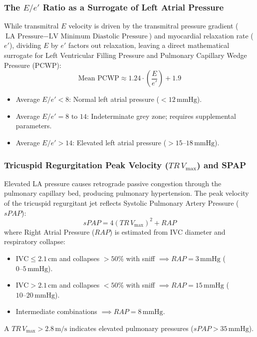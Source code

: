 \documentclass[11pt,a4paper]{article}
\begin{document}
\subsubsection{The \texorpdfstring{$E/e'$}{E/e'} Ratio as a Surrogate of Left Atrial Pressure}
While transmitral $E$ velocity is driven by the transmitral pressure gradient ($\text{LA Pressure} - \text{LV Minimum Diastolic Pressure}$) and myocardial relaxation rate ($e'$), dividing $E$ by $e'$ factors out relaxation, leaving a direct mathematical surrogate for Left Ventricular Filling Pressure and Pulmonary Capillary Wedge Pressure (PCWP):
\begin{equation}
    \text{Mean PCWP} \approx 1.24 \cdot \left( \frac{E}{e'} \right) + 1.9
\end{equation}
\begin{itemize}[leftmargin=*]
    \item Average $E/e' < 8$: Normal left atrial pressure ($< 12\,\text{mmHg}$).
    \item Average $E/e' = 8\text{ to }14$: Indeterminate grey zone; requires supplemental parameters.
    \item Average $E/e' > 14$: Elevated left atrial pressure ($> 15\text{--}18\,\text{mmHg}$).
\end{itemize}

\subsubsection{Tricuspid Regurgitation Peak Velocity (\texorpdfstring{$TR\,V_{\text{max}}$}{TR Vmax}) and SPAP}
Elevated LA pressure causes retrograde passive congestion through the pulmonary capillary bed, producing pulmonary hypertension. The peak velocity of the tricuspid regurgitant jet reflects Systolic Pulmonary Artery Pressure ($sPAP$):
\begin{equation}
    sPAP = 4 \left( TR\,V_{\text{max}} \right)^2 + RAP
\end{equation}
where Right Atrial Pressure ($RAP$) is estimated from IVC diameter and respiratory collapse:
\begin{itemize}[leftmargin=*]
    \item $\text{IVC} \le 2.1\,\text{cm}$ and collapses $> 50\%$ with sniff $\implies RAP = 3\,\text{mmHg}$ ($0\text{--}5\,\text{mmHg}$).
    \item $\text{IVC} > 2.1\,\text{cm}$ and collapses $< 50\%$ with sniff $\implies RAP = 15\,\text{mmHg}$ ($10\text{--}20\,\text{mmHg}$).
    \item Intermediate combinations $\implies RAP = 8\,\text{mmHg}$.
\end{itemize}
A $TR\,V_{\text{max}} > 2.8\,\text{m/s}$ indicates elevated pulmonary pressures ($sPAP > 35\,\text{mmHg}$).
\end{document}
